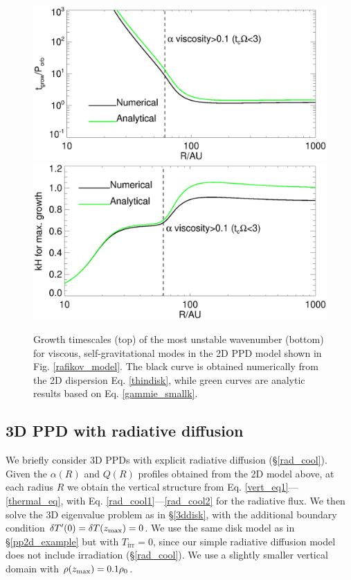\begin{figure}
  \includegraphics[width=\linewidth,clip=true,trim=0cm 1.5cm 0cm
    0.0cm]{figures/ppd_2d_growth}\\
  \includegraphics[width=\linewidth,clip=true,trim=0cm 0cm 0cm
    0.8cm]{figures/ppd_2d_maxk}
  \caption{Growth timescales (top) of the most unstable
    wavenumber (bottom) for viscous,
    self-gravitational modes in the 2D PPD model shown in
    Fig. \ref{rafikov_model}. 
    The black curve is obtained numerically
    from the 2D dispersion Eq. \ref{thindisk}, while green curves 
    are analytic results based on Eq. \ref{gammie_smallk}. 
    \label{rafikov_growth}}
\end{figure}


\subsection{3D PPD with radiative diffusion}
We briefly consider 3D PPDs with explicit radiative diffusion
(\S\ref{rad_cool}). 
Given the $\alpha(R)$ and $Q(R)$ profiles obtained
from the 2D model above, at each radius $R$ we obtain the vertical
structure from Eq. \ref{vert_eq1}---\ref{thermal_eq}, with 
Eq. \ref{rad_cool1}---\ref{rad_cool2} for the radiative flux.
We then solve the 3D eigenvalue problem as in \S\ref{3ddisk}, with the
additional boundary condition $\delta T^\prime(0) = \delta T(z_\mathrm{max}) = 0$.    
We use the same disk model as in \S\ref{pp2d_example} but 
with $T_\mathrm{irr}=0$, since our simple radiative diffusion model
does not include irradiation (\S\ref{rad_cool}). 
We use a slightly smaller vertical
domain with $\rho(z_\mathrm{max})=0.1\rho_0$.  %

